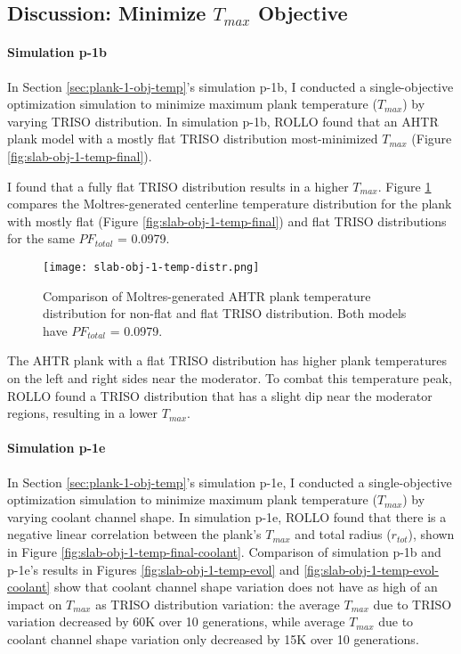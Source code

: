 \subsection{Discussion: Minimize $T_{max}$ Objective}
\label{sec:plank-discussion-temp}
\paragraph{Simulation p-1b}
In Section \ref{sec:plank-1-obj-temp}'s simulation p-1b, I conducted a single-objective 
optimization simulation to minimize maximum plank temperature ($T_{max}$) by varying 
TRISO distribution. 
In simulation p-1b, \gls{ROLLO} found that an \gls{AHTR} plank model with a mostly 
flat TRISO distribution most-minimized $T_{max}$ 
(Figure \ref{fig:slab-obj-1-temp-final}).

I found that a fully flat \gls{TRISO} distribution results in a higher $T_{max}$.
Figure \ref{fig:slab-obj-1-temp-distr} compares the Moltres-generated centerline 
temperature distribution for the plank with mostly flat (Figure 
\ref{fig:slab-obj-1-temp-final}) and flat TRISO distributions for the same 
$PF_{total}$ = 0.0979. 
\begin{figure}[htbp!]
    \centering
    \texttt{[image: slab-obj-1-temp-distr.png]}
    \caption{Comparison of Moltres-generated AHTR plank temperature distribution for 
    non-flat and flat TRISO distribution. 
    Both models have $PF_{total}$ = 0.0979.}
    \label{fig:slab-obj-1-temp-distr}
\end{figure}
The \gls{AHTR} plank with a flat \gls{TRISO} distribution has higher plank temperatures 
on the left and right sides near the moderator. 
To combat this temperature peak, ROLLO found a \gls{TRISO} distribution that 
has a slight dip near the moderator regions, resulting in a lower $T_{max}$.

\paragraph{Simulation p-1e}
In Section \ref{sec:plank-1-obj-temp}'s simulation p-1e, I conducted a single-objective 
optimization simulation to minimize maximum plank temperature ($T_{max}$) by varying 
coolant channel shape. 
In simulation p-1e, \gls{ROLLO} found that there is a negative linear correlation 
between the plank's $T_{max}$ and total radius ($r_{tot}$), shown in 
Figure \ref{fig:slab-obj-1-temp-final-coolant}. 
Comparison of simulation p-1b and p-1e's results in 
Figures \ref{fig:slab-obj-1-temp-evol} and \ref{fig:slab-obj-1-temp-evol-coolant} 
show that coolant channel shape variation does not have as high of an impact on 
$T_{max}$ as \gls{TRISO} distribution variation: the average $T_{max}$ due to 
\gls{TRISO} variation decreased by 60K over 10 generations, while average $T_{max}$ due 
to coolant channel shape variation only decreased by 15K over 10 generations. 

